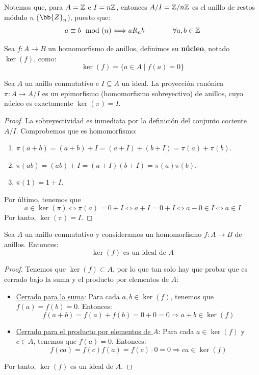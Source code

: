 Notemos que, para $A=\mathbb Z$ e $I=n\mathbb Z$, entonces $A/I = \mathbb Z/n\mathbb Z$ es el anillo de restos módulo $n$ ($\bb{Z}_n$), puesto que:
\begin{equation*}
    a\equiv b\mod(n) \Longleftrightarrow aR_nb\qquad\qquad\forall a,b \in \mathbb Z
\end{equation*}

\begin{definicion}
    Sea $f:A\rightarrow B$ un homomorfismo de anillos, definimos su \textbf{núcleo}, notado $\ker(f)$, como:
    $$\ker(f) = \{a \in A \mid f(a) = 0\}$$
\end{definicion}

\begin{prop}
    Sea $A$ un anillo conmutativo e $I \subseteq A$ un ideal.
La proyección canónica $\pi: A \longrightarrow A/I$ es un epimorfismo (homomorfismo sobreyectivo) de anillos, cuyo núcleo es exactamente $\ker(\pi) = I$.
\end{prop}
\begin{proof}
La sobreyectividad es inmediata por la definición del conjunto cociente $A/I$. Comprobemos que es homomorfismo:
\begin{enumerate}
    \item $\pi(a + b) = (a + b) + I = (a + I) + (b + I) = \pi(a) + \pi(b)$.
    \item $\pi(ab) = (ab) + I = (a + I)(b + I) = \pi(a)\pi(b)$.
    \item $\pi(1) = 1 + I$.
\end{enumerate}
Por último, tenemos que
$$a \in \ker(\pi) \iff \pi(a) = 0 + I \iff a + I = 0 + I \iff a - 0 \in I \iff a \in I$$
Por tanto, $\ker(\pi) = I$.
\end{proof}




\begin{prop}
    Sea $A$ un anillo conmutativo y consideramos un homomorfismo $f:A\longrightarrow B$ de anillos. Entonces:
    $$\ker(f) \text{ es un ideal de } A$$
\begin{proof}
    Tenemos que $\ker(f)\subset A$, por lo que tan solo hay que probar que es cerrado bajo la suma y el producto por elementos de $A$:
    \begin{itemize}
        \item \ul{Cerrado para la suma}: Para cada $a,b \in \ker(f)$, tenemos que $f(a)=f(b)=0$. Entonces:
              $$f(a+b) = f(a)+f(b) = 0+0 = 0 \Longrightarrow a+b \in \ker(f)$$
        \item \ul{Cerrado para el producto por elementos de $A$}: Para cada $a \in \ker(f)$ y $c\in A$, tenemos que $f(a)=0$. Entonces:
              $$f(ca) = f(c)f(a) = f(c)\cdot 0 = 0 \Longrightarrow ca \in \ker(f)$$
    \end{itemize}
    Por tanto, $\ker(f)$ es un ideal de $A$.
\end{proof}
\end{prop}



